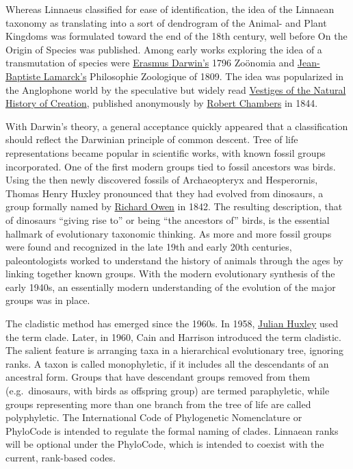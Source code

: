Whereas Linnaeus classified for ease of identification, the idea of the Linnaean taxonomy as translating into a sort of dendrogram of the Animal- and Plant Kingdoms was formulated toward the end of the 18th century, well before On the Origin of Species was published. Among early works exploring the idea of a transmutation of species were \href{https://en.wikipedia.org/wiki/Erasmus_Darwin}{Erasmus Darwin's} 1796 Zoönomia and \href{https://en.wikipedia.org/wiki/Jean-Baptiste_Lamarck}{Jean-Baptiste Lamarck's} Philosophie Zoologique of 1809. The idea was popularized in the Anglophone world by the speculative but widely read \href{https://en.wikipedia.org/wiki/Vestiges_of_the_Natural_History_of_Creation}{Vestiges of the Natural History of Creation}, published anonymously by \href{https://en.wikipedia.org/wiki/Robert_Chambers_(publisher,_born_1802)}{Robert Chambers} in 1844.

With Darwin's theory, a general acceptance quickly appeared that a classification should reflect the Darwinian principle of common descent. Tree of life representations became popular in scientific works, with known fossil groups incorporated. One of the first modern groups tied to fossil ancestors was birds. Using the then newly discovered fossils of Archaeopteryx and Hesperornis, Thomas Henry Huxley pronounced that they had evolved from dinosaurs, a group formally named by \href{https://en.wikipedia.org/wiki/Richard_Owen}{Richard Owen} in 1842. The resulting description, that of dinosaurs ``giving rise to'' or being ``the ancestors of'' birds, is the essential hallmark of evolutionary taxonomic thinking. As more and more fossil groups were found and recognized in the late 19th and early 20th centuries, paleontologists worked to understand the history of animals through the ages by linking together known groups. With the modern evolutionary synthesis of the early 1940s, an essentially modern understanding of the evolution of the major groups was in place.

The cladistic method has emerged since the 1960s. In 1958, \href{https://en.wikipedia.org/wiki/Julian_Huxley}{Julian Huxley} used the term clade. Later, in 1960, Cain and Harrison introduced the term cladistic. The salient feature is arranging taxa in a hierarchical evolutionary tree, ignoring ranks. A taxon is called monophyletic, if it includes all the descendants of an ancestral form. Groups that have descendant groups removed from them (e.g.~dinosaurs, with birds as offspring group) are termed paraphyletic, while groups representing more than one branch from the tree of life are called polyphyletic. The International Code of Phylogenetic Nomenclature or PhyloCode is intended to regulate the formal naming of clades. Linnaean ranks will be optional under the PhyloCode, which is intended to coexist with the current, rank-based codes.

